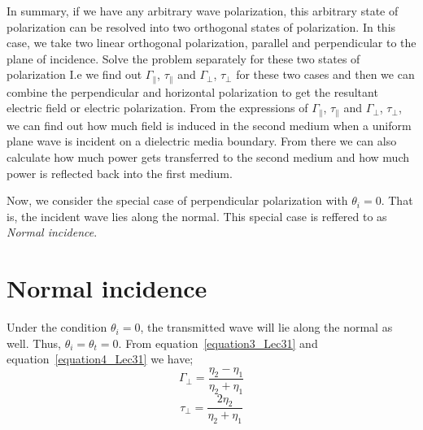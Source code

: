 In summary, if we have any arbitrary wave polarization, this arbitrary state of polarization can be resolved into two orthogonal states of polarization. In this case, we take two linear orthogonal polarization, parallel and perpendicular to the plane of incidence. Solve the problem separately for these two states of polarization I.e we find out $\Gamma_{\parallel}$,  $\tau_{\parallel}$ and $\Gamma_{\perp}$, $\tau_{\perp}$ for these two cases and then we can combine the perpendicular and horizontal polarization to get the resultant electric field or electric polarization. From the expressions of $\Gamma_{\parallel}$,  $\tau_{\parallel}$ and $\Gamma_{\bot}$, $\tau_{\bot}$, we can find out how much field is induced in the second medium when a uniform plane wave is incident on a dielectric media boundary. From there we can also calculate how much power gets transferred to the second medium and how much power is reflected back into the first medium.
 
Now, we consider the special case of perpendicular polarization with  $\theta_{i} = 0$. That is, the incident wave lies along the normal. This special case is reffered to as \emph{Normal incidence}.

\section{Normal incidence} 

Under the condition $\theta_{i} = 0$, the transmitted wave will lie along the normal as well. Thus,  $\theta_{i} = \theta_{t} = 0$. From equation~\ref{equation3_Lec31} and equation~\ref{equation4_Lec31} we have;
\begin{equation}
\Gamma_{\perp} = \frac{\eta_{2} - \eta_{1}}{\eta_{2} + \eta_{1}}
\end{equation}
\begin{equation}
\tau_{\perp} = \frac{2 \eta_{2}}{\eta_{2} + \eta_{1}}
\end{equation}

